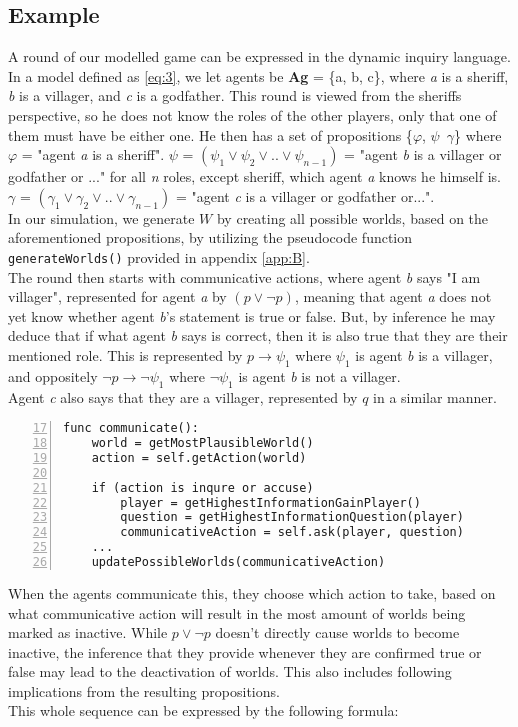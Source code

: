 \subsection{Example}
A round of our modelled game can be expressed in the dynamic inquiry language.
In a model defined as \cref{eq:3}, we let agents be \textbf{Ag} = \{a, b, c\},
where \textit{a} is a sheriff, \textit{b} is a villager, and \textit{c} is a
godfather. This round is viewed from the sheriffs perspective, so he does not
know the roles of the other players, only that one of them must have be either
one. He then has a set of propositions \{$\varphi$, $\psi$\, $\gamma$\} where
$\varphi$ = "agent \textit{a} is a sheriff". $\psi$ = $(\psi_1 \lor \psi_2 \lor
    .. \lor \psi_{n-1})$ = "agent \textit{b} is a villager or godfather or ..." for
all \textit{n} roles, except sheriff, which agent \textit{a} knows he himself
is. $\gamma$ = $(\gamma_1 \lor \gamma_2 \lor .. \lor \gamma_{n-1}) $ = "agent
\textit{c} is a villager or godfather or...". \\ In our simulation, we generate
$W$ by creating all possible worlds, based on the aforementioned propositions,
by utilizing the pseudocode function \lstinline{generateWorlds()} provided in
appendix \ref{app:B}. \\ The round then starts with communicative actions,
where agent \textit{b} says "I am villager", represented for agent \textit{a}
by $(p \lor \neg p)$, meaning that agent \textit{a} does not yet know whether
agent \textit{b}'s statement is true or false. But, by inference he may deduce
that if what agent \textit{b} says is correct, then it is also true that they
are their mentioned role. This is represented by $p \rightarrow \psi_1$ where
$\psi_1$ is agent \textit{b} is a villager, and oppositely $\neg p \rightarrow
    \neg \psi_1$ where $\neg \psi_1$ is agent \textit{b} is not a villager. \\
Agent \textit{c} also says that they are a villager, represented by $q$ in a
similar manner.

\begin{lstlisting}[basicstyle=\footnotesize\ttfamily, numbers=left, xleftmargin=0.5cm, firstnumber=17, caption={Snippet from appendix C}, captionpos=b]
func communicate():
	world = getMostPlausibleWorld()
	action = self.getAction(world)
	
	if (action is inqure or accuse)
		player = getHighestInformationGainPlayer()
		question = getHighestInformationQuestion(player)
		communicativeAction = self.ask(player, question)
	...
	updatePossibleWorlds(communicativeAction)
\end{lstlisting}\label{lst:communicate}
When the agents communicate this, they choose which action to take, based on
what communicative action will result in the most amount of worlds being marked
as inactive. While $p \lor \neg p$ doesn't directly cause worlds to become
inactive, the inference that they provide whenever they are confirmed true or
false may lead to the deactivation of worlds. This also includes following
implications from the resulting propositions.\\
This whole sequence can be expressed by the following formula:

